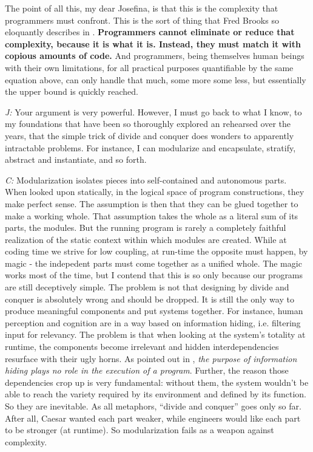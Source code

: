 \documentclass[10pt]{sigplanconf}
\begin{document}
The point of all this, my dear Josefina, is that this is the complexity that programmers must confront. This is the sort of thing that Fred Brooks so eloquantly describes in \cite{brooks}. \textbf{Programmers cannot eliminate or reduce that complexity, because it is what it is. Instead, they must match it with copious amounts of code.} And programmers, being themselves human beings with their own limitations, for all practical purposes quantifiable by the same equation above, can only handle that much, some more some less, but essentially the upper bound is quickly reached.

\emph{J:} Your argument is very powerful. However, I must go back to what I know, to my foundations that have been so thoroughly explored an rehearsed over the years, that the simple trick of divide and conquer does wonders to apparently intractable problems. For instance, I can modularize and encapsulate, stratify, abstract and instantiate, and so forth.

\emph{C:} Modularization isolates pieces into self-contained and autonomous parts. When looked upon statically, in the logical space of program constructions, they make perfect sense. The assumption is then that they can be glued together to make a working whole. That assumption takes the whole as a literal sum of its parts, the modules. But the running program is rarely a completely faithful realization of the static context within which modules are created. While at coding time we strive for low coupling, at run-time the opposite must happen, by magic - the indepedent parts must come together as a unified whole. The magic works most of the time, but I contend that this is so only because our programs are still deceptively simple. The problem is not that designing by divide and conquer is absolutely wrong and should be dropped. It is still the only way to produce meaningful components and put systems together. For instance, human perception and cognition are in a way based on information hiding, i.e. filtering input for relevancy. The problem is that when looking at the system's totality at runtime, the components become irrelevant and hidden interdependencies resurface with their ugly horns. As pointed out in \cite{gabriel}, \emph{the purpose of information hiding plays no role in the execution of a program}. Further, the reason those dependencies crop up is very fundamental: without them, the system wouldn't be able to reach the variety required by its environment and defined by its function. So they are inevitable. As all metaphors, ``divide and conquer'' goes only so far. After all, Caesar wanted each part weaker, while engineers would like each part to be stronger (at runtime). So modularization fails as a weapon against complexity.
\end{document}
